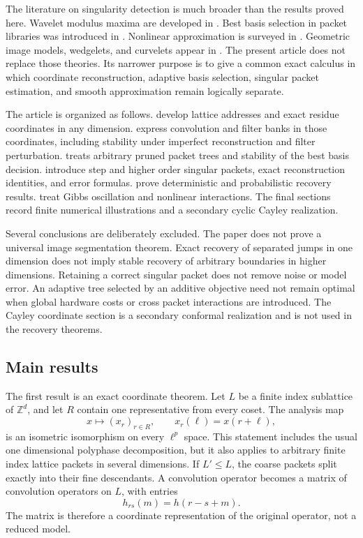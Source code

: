 \documentclass[11pt,letterpaper]{article}
\theoremstyle{plain}
\theoremstyle{plain}
\theoremstyle{plain}
\theoremstyle{definition}
\theoremstyle{definition}
\theoremstyle{definition}
\theoremstyle{definition}
\theoremstyle{remark}
\theoremstyle{remark}
\theoremstyle{remark}
\theoremstyle{remark}
\newcommand{\ZZ}{\mathbb Z}
\begin{document}
The literature on singularity detection is much broader than the results proved here. Wavelet modulus maxima are developed in \cite{MallatHwang1992}. Best basis selection in packet libraries was introduced in \cite{CoifmanWickerhauser1992}. Nonlinear approximation is surveyed in \cite{DeVore1998}. Geometric image models, wedgelets, and curvelets appear in \cite{Donoho1999,CandesDonoho2004}. The present article does not replace those theories. Its narrower purpose is to give a common exact calculus in which coordinate reconstruction, adaptive basis selection, singular packet estimation, and smooth approximation remain logically separate.

The article is organized as follows.  develop lattice addresses and exact residue coordinates in any dimension.  express convolution and filter banks in those coordinates, including stability under imperfect reconstruction and filter perturbation.  treats arbitrary pruned packet trees and stability of the best basis decision.  introduce step and higher order singular packets, exact reconstruction identities, and error formulas.  prove deterministic and probabilistic recovery results.  treat Gibbs oscillation and nonlinear interactions. The final sections record finite numerical illustrations and a secondary cyclic Cayley realization.

Several conclusions are deliberately excluded. The paper does not prove a universal image segmentation theorem. Exact recovery of separated jumps in one dimension does not imply stable recovery of arbitrary boundaries in higher dimensions. Retaining a correct singular packet does not remove noise or model error. An adaptive tree selected by an additive objective need not remain optimal when global hardware costs or cross packet interactions are introduced. The Cayley coordinate section is a secondary conformal realization and is not used in the recovery theorems.

\subsection{Main results}

The first result is an exact coordinate theorem. Let \(L\) be a finite index sublattice of \(\ZZ^d\), and let \(R\) contain one representative from every coset. The analysis map
\[
x\longmapsto (x_r)_{r\in R},
\qquad
x_r(\ell)=x(r+\ell),
\]
is an isometric isomorphism on every \(\ell^p\) space. This statement includes the usual one dimensional polyphase decomposition, but it also applies to arbitrary finite index lattice packets in several dimensions. If \(L'\leq L\), the coarse packets split exactly into their fine descendants. A convolution operator becomes a matrix of convolution operators on \(L\), with entries
\[
h_{rs}(m)=h(r-s+m).
\]
The matrix is therefore a coordinate representation of the original operator, not a reduced model.
\end{document}
